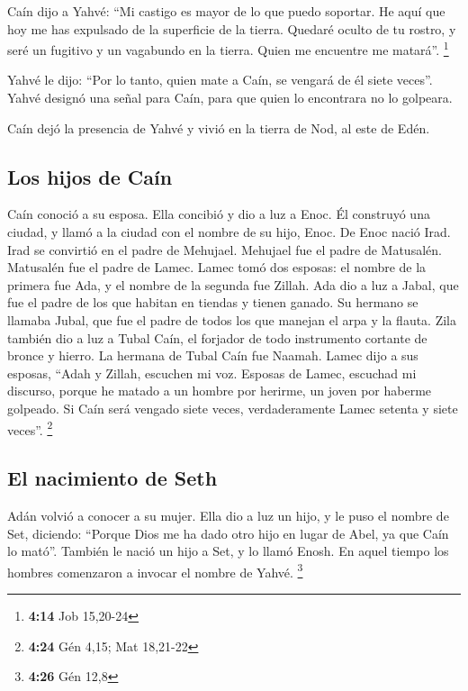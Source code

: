  Caín dijo a Yahvé: ``Mi castigo es mayor de lo que puedo
soportar.  He aquí que hoy me has expulsado de la
superficie de la tierra. Quedaré oculto de tu rostro, y seré un fugitivo
y un vagabundo en la tierra. Quien me encuentre me matará''. \footnote{\textbf{4:14}
  Job 15,20-24}

 Yahvé le dijo: ``Por lo tanto, quien mate a Caín, se
vengará de él siete veces''. Yahvé designó una señal para Caín, para que
quien lo encontrara no lo golpeara.

 Caín dejó la presencia de Yahvé y vivió en la tierra de
Nod, al este de Edén.

\hypertarget{los-hijos-de-cauxedn}{%
\subsection{Los hijos de Caín}\label{los-hijos-de-cauxedn}}

 Caín conoció a su esposa. Ella concibió y dio a luz a
Enoc. Él construyó una ciudad, y llamó a la ciudad con el nombre de su
hijo, Enoc.  De Enoc nació Irad. Irad se convirtió en el
padre de Mehujael. Mehujael fue el padre de Matusalén. Matusalén fue el
padre de Lamec.  Lamec tomó dos esposas: el nombre de la
primera fue Ada, y el nombre de la segunda fue Zillah. 
Ada dio a luz a Jabal, que fue el padre de los que habitan en tiendas y
tienen ganado.  Su hermano se llamaba Jubal, que fue el
padre de todos los que manejan el arpa y la flauta.  Zila
también dio a luz a Tubal Caín, el forjador de todo instrumento cortante
de bronce y hierro. La hermana de Tubal Caín fue Naamah. 
Lamec dijo a sus esposas, ``Adah y Zillah, escuchen mi voz. Esposas de
Lamec, escuchad mi discurso, porque he matado a un hombre por herirme,
un joven por haberme golpeado.  Si Caín será vengado
siete veces, verdaderamente Lamec setenta y siete veces''. \footnote{\textbf{4:24}
  Gén 4,15; Mat 18,21-22}

\hypertarget{el-nacimiento-de-seth}{%
\subsection{El nacimiento de Seth}\label{el-nacimiento-de-seth}}

 Adán volvió a conocer a su mujer. Ella dio a luz un
hijo, y le puso el nombre de Set, diciendo: ``Porque Dios me ha dado
otro hijo en lugar de Abel, ya que Caín lo mató''. 
También le nació un hijo a Set, y lo llamó Enosh. En aquel tiempo los
hombres comenzaron a invocar el nombre de Yahvé. \footnote{\textbf{4:26}
  Gén 12,8}

